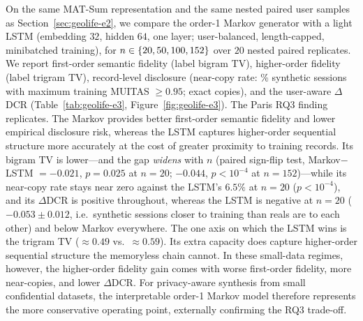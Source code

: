 \documentclass[sigconf,nonacm]{acmart}
\begin{document}
On the same MAT-Sum representation and the same nested paired user samples as
Section~\ref{sec:geolife-e2}, we compare the order-1 Markov generator with a light LSTM
(embedding $32$, hidden $64$, one layer; user-balanced, length-capped, minibatched training),
for $n\in\{20,50,\-100,152\}$ over $20$ nested paired replicates. We report first-order semantic
fidelity (label bigram TV), higher-order fidelity (label trigram TV), record-level disclosure
(near-copy rate: \% synthetic sessions with maximum training MUITAS $\ge 0.95$; exact copies),
and the user-aware $\Delta$DCR (Table~\ref{tab:geolife-e3}, Figure~\ref{fig:geolife-e3}).
The Paris RQ3 finding replicates. The Markov provides better first-order semantic fidelity and lower empirical disclosure risk, whereas the LSTM captures higher-order sequential structure more accurately at the cost of greater proximity to training records. Its bigram TV is lower---and the gap \emph{widens} with $n$
(paired sign-flip test, Markov$-$LSTM $=-0.021$, $p{=}0.025$ at $n{=}20$; $-0.044$, $p{<}10^{-4}$
at $n{=}152$)---while its near-copy rate stays near zero against the LSTM's $6.5\%$ at $n{=}20$
($p{<}10^{-4}$), and its $\Delta$DCR is positive throughout, whereas the LSTM is negative at
$n{=}20$ ($-0.053\pm0.012$, i.e.\ synthetic sessions closer to training than reals are to each
other) and below Markov everywhere. The one axis on which the LSTM wins is the trigram TV
($\approx0.49$ vs.\ $\approx0.59$). Its extra capacity does capture higher-order sequential structure the memoryless chain cannot. In these small-data regimes, however, the higher-order fidelity gain comes with worse first-order fidelity, more near-copies, and lower
$\Delta$DCR. For privacy-aware synthesis from small confidential datasets, the
interpretable order-1 Markov model therefore represents the more conservative operating point, externally confirming the RQ3 trade-off.
\end{document}
